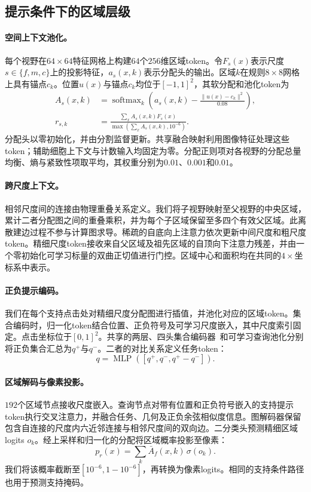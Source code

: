 \subsection{提示条件下的区域层级}
\label{sec:regions}
\paragraph{空间上下文池化。}
每个视野在$64\times64$特征网格上构建$64$个$256$维区域token。令$F_s(x)$表示尺度$s\in\{f,m,c\}$上的投影特征，$a_s(x,k)$表示分配头的输出。区域$k$在规则$8\times8$网格上具有锚点$c_k$。位置$u(x)$与锚点$c_k$均位于$[-1,1]^2$，其软分配和池化token为
\begin{align}
 A_s(x,k)&=\operatorname{softmax}_{k}\!\left(a_s(x,k)-\frac{\|u(x)-c_k\|^2}{0.08}\right),\label{eq:assignment}\\
 r_{s,k}&=\frac{\sum_x A_s(x,k)F_s(x)}{\max(\sum_x A_s(x,k),10^{-6})}.
\end{align}
分配头以零初始化，并由分割监督更新。共享融合映射利用图像特征处理这些token；辅助细胞上下文与计数输入均固定为零。分配正则项对各视野的分配总量均衡、熵与紧致性项取平均，其权重分别为$0.01$、$0.001$和$0.01$。

\paragraph{跨尺度上下文。}
相邻尺度间的连接由物理重叠关系定义。我们将子视野映射至父视野的中央区域，累计二者分配图之间的重叠乘积，并为每个子区域保留至多四个有效父区域。此离散建边过程不参与计算图求导。稀疏的自底向上注意力依次更新中间尺度和粗尺度token。精细尺度token接收来自父区域及祖先区域的自顶向下注意力残差，并由一个零初始化可学习标量的双曲正切值进行门控。区域中心和面积均在共同的$4\times$坐标系中表示。

\paragraph{正负提示编码。}
我们在每个支持点击处对精细尺度分配图进行插值，并池化对应的区域token。集合编码时，归一化token结合位置、正负符号及可学习尺度嵌入，其中尺度索引固定。点击坐标位于$[0,1]^2$。共享的两层、四头集合编码器~\cite{lee2019settransformer}和可学习查询池化分别将正负集合汇总为$q^+$与$q^-$。二者的对比关系定义任务token：
\begin{equation}
 q=\operatorname{MLP}([q^+,q^-,q^+-q^-]).
\end{equation}

\paragraph{区域解码与像素投影。}
$192$个区域节点接收尺度嵌入。查询节点对带有位置和正负符号嵌入的支持提示token执行交叉注意力，并融合任务、几何及正负余弦相似度信息。图解码器保留包含自连接的尺度内六近邻连接与相邻尺度间的双向边。二分类头预测精细区域logits $o_k$。经上采样和归一化的分配将区域概率投影至像素：
\begin{equation}
 p_r(x)=\sum_k\bar A_f(x,k)\,\sigma(o_k).
\label{eq:projection}
\end{equation}
我们将该概率截断至$[10^{-6},1-10^{-6}]$，再转换为像素logits。相同的支持条件路径也用于预测支持掩码。

